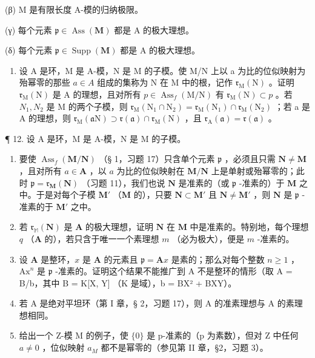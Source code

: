(β) M 是有限长度 A-模的归纳极限。

(γ) 每个元素 \(\mathfrak{p} \in \operatorname{Ass}(\mathbf{M})\) 都是 A 的极大理想。

(δ) 每个元素 \(\mathfrak{p} \in \operatorname{Supp}(\mathbf{M})\) 都是 A 的极大理想。

\begin{enumerate}
\def\labelenumi{\arabic{enumi}.}
\setcounter{enumi}{10}
\tightlist
\item
  设 A 是环，M 是 A-模，N 是 M 的子模。使 M/N 上以 a 为比的位似映射为殆幂零的那些 \(a \in A\) 组成的集称为 N 在 M 中的根，记作 \(\mathfrak{r}_{\mathrm{M}}(\mathrm{N})\) 。证明 \(\mathfrak{r}_{\mathrm{M}}(\mathrm{N})\) 是 A 的理想，且对所有 \(p \in \operatorname{Ass}_{f}(\mathrm{M}/\mathrm{N})\) 有 \(\mathfrak{r}_{\mathrm{M}}(\mathrm{N}) \subset p\) 。若 \(N_{1}, N_{2}\) 是 M 的两个子模，则 \(\mathfrak{r}_{\mathrm{M}}(\mathrm{N}_{1} \cap \mathrm{N}_{2}) = \mathfrak{r}_{\mathrm{M}}(\mathrm{N}_{1}) \cap \mathfrak{r}_{\mathrm{M}}(\mathrm{N}_{2})\) ；若 a 是 A 的理想，则 \(\mathfrak{r}_{\mathrm{M}}(\mathfrak{a}\mathrm{N}) \supset \mathfrak{r}(\mathfrak{a}) \cap \mathfrak{r}_{\mathrm{M}}(\mathrm{N})\) ，且 \(\mathfrak{r}_{\mathrm{A}}(\mathfrak{a}) = \mathfrak{r}(\mathfrak{a})\) 。
\end{enumerate}

¶ 12. 设 A 是环，M 是 A-模，N 是 M 的子模。

\begin{enumerate}
\def\labelenumi{(\alph{enumi})}
\item
  要使 \(\operatorname{Ass}_f(\mathbf{M} / \mathbf{N})\) （§ 1，习题 17）只含单个元素 \(\mathfrak{p}\) ，必须且只需 \(\mathbf{N} \neq \mathbf{M}\) ，且对所有 \(a \in \mathbf{A}\) ，以 \(a\) 为比的位似映射在 \(\mathbf{M} / \mathbf{N}\) 上是单射或殆幂零的；此时 \(\mathfrak{p} = \mathfrak{r}_{\mathbf{M}}(\mathbf{N})\) （习题 11），我们也说 \(\mathbf{N}\) 是准素的（或 \(\mathfrak{p}\) -准素的）于 \(\mathbf{M}\) 之中。于是对每个子模 \(\mathbf{M}'\) （\(\mathbf{M}\) 的），只要 \(\mathbf{N} \subset \mathbf{M}'\) 且 \(\mathbf{N} \neq \mathbf{M}'\) ，则 \(\mathbf{N}\) 是 \(\mathfrak{p}\) -准素的于 \(\mathbf{M}'\) 之中。
\item
  若 \(\mathfrak{r}_{\mathbb{M}}(\mathbf{N})\) 是 \(\mathbf{A}\) 的极大理想，证明 \(\mathbf{N}\) 在 \(\mathbf{M}\) 中是准素的。特别地，每个理想 \(q\) （\(\mathbf{A}\) 的），若只含于唯一一个素理想 \(m\) （必为极大），便是 \(m\) -准素的。
\item
  设 \(\mathbf{A}\) 是整环，\(x\) 是 \(\mathbf{A}\) 的元素且 \(\mathfrak{p} = \mathbf{A}x\) 是素的；那么对每个整数 \(n \geqslant 1\) ，\(\mathrm{Ax}^n\) 是 \(\mathfrak{p}\) -准素的。证明这个结果不能推广到 A 不是整环的情形（取 A = B/b，其中 B = K{[}X, Y{]} （K 是域），b = BX² + BXY）。
\item
  若 A 是绝对平坦环（第 I 章，§ 2，习题 17），则 A 的准素理想与 A 的素理想相同。
\item
  给出一个 Z-模 M 的例子，使 \(\{0\}\) 是 p-准素的（p 为素数），但对 Z 中任何 \(a \neq 0\) ，位似映射 \(a_{M}\) 都不是幂零的（参见第 II 章，§2，习题 3）。
\end{enumerate}


